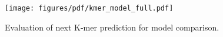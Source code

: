 \begin{figure}[ht]
    \centering
    \texttt{[image: figures/pdf/kmer\_model\_full.pdf]}
    \caption{Evaluation of next K-mer prediction for model comparison.}
    \label{fig:kmer_model}
\end{figure}